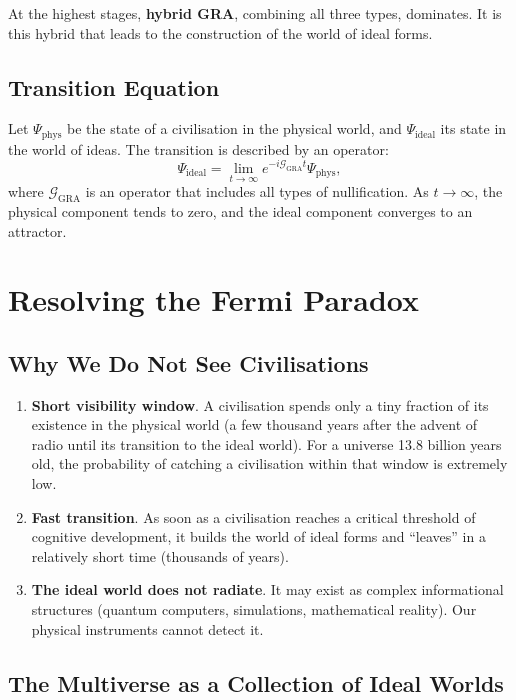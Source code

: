 \documentclass[12pt,a4paper]{article}
\begin{document}
At the highest stages, \textbf{hybrid GRA}, combining all three types, dominates. It is this hybrid that leads to the construction of the world of ideal forms.

\subsection{Transition Equation}

Let \(\Psi_{\text{phys}}\) be the state of a civilisation in the physical world, and \(\Psi_{\text{ideal}}\) its state in the world of ideas. The transition is described by an operator:
\[
\Psi_{\text{ideal}} = \lim_{t \to \infty} e^{-i \mathcal{G}_{\text{GRA}} t} \Psi_{\text{phys}},
\]
where \(\mathcal{G}_{\text{GRA}}\) is an operator that includes all types of nullification. As \(t \to \infty\), the physical component tends to zero, and the ideal component converges to an attractor.

\section{Resolving the Fermi Paradox}

\subsection{Why We Do Not See Civilisations}

\begin{enumerate}
    \item \textbf{Short visibility window}. A civilisation spends only a tiny fraction of its existence in the physical world (a few thousand years after the advent of radio until its transition to the ideal world). For a universe 13.8 billion years old, the probability of catching a civilisation within that window is extremely low.
    \item \textbf{Fast transition}. As soon as a civilisation reaches a critical threshold of cognitive development, it builds the world of ideal forms and “leaves” in a relatively short time (thousands of years).
    \item \textbf{The ideal world does not radiate}. It may exist as complex informational structures (quantum computers, simulations, mathematical reality). Our physical instruments cannot detect it.
\end{enumerate}

\subsection{The Multiverse as a Collection of Ideal Worlds}
\end{document}
